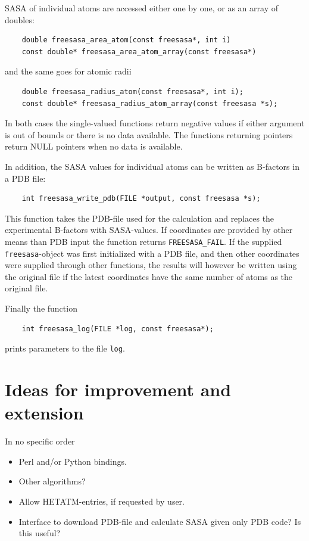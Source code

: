 \documentclass[a4paper,11pt]{article}
\begin{document}
SASA of individual atoms are accessed either one by one, or
as an array of doubles:
\begin{verbatim}
    double freesasa_area_atom(const freesasa*, int i)
    const double* freesasa_area_atom_array(const freesasa*)
\end{verbatim}
and the same goes for atomic radii
\begin{verbatim}
    double freesasa_radius_atom(const freesasa*, int i);
    const double* freesasa_radius_atom_array(const freesasa *s);
\end{verbatim}
In both cases the single-valued functions return negative values if
either argument is out of bounds or there is no data available. The
functions returning pointers return NULL pointers when no data is
available.

In addition, the SASA values for individual atoms can be written as
B-factors in a PDB file:
\begin{verbatim}
    int freesasa_write_pdb(FILE *output, const freesasa *s);
\end{verbatim}
This function takes the PDB-file used for the calculation and replaces
the experimental B-factors with SASA-values. If coordinates are
provided by other means than PDB input the function returns
\verb|FREESASA_FAIL|. If the supplied \verb|freesasa|-object was first
initialized with a PDB file, and then other coordinates were supplied
through other functions, the results will however be written using the
original file if the latest coordinates have the same number of atoms
as the original file.

Finally the function
\begin{verbatim}
    int freesasa_log(FILE *log, const freesasa*);
\end{verbatim}
prints parameters to the file \verb|log|.

\section{Ideas for improvement and extension}

In no specific order
\begin{itemize}
\item Perl and/or Python bindings.
\item Other algorithms?
\item Allow HETATM-entries, if requested by user.
\item Interface to download PDB-file and calculate SASA given only PDB
  code? Is this useful?
\end{itemize}
\end{document}
